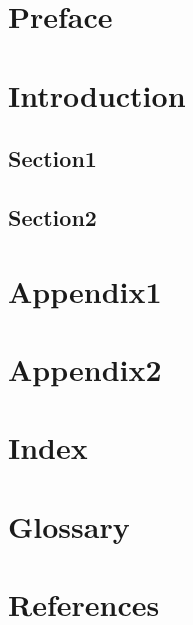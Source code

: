 \documentclass{book}
\begin{document}
\tableofcontents

\frontmatter
\chapter{Preface}
\mainmatter
\chapter{Introduction}
\section{Section1}
\section{Section2}
\appendix
\chapter{Appendix1}
\chapter{Appendix2}
\backmatter
\chapter{Index}
\chapter{Glossary}
\chapter{References}
\end{document}

